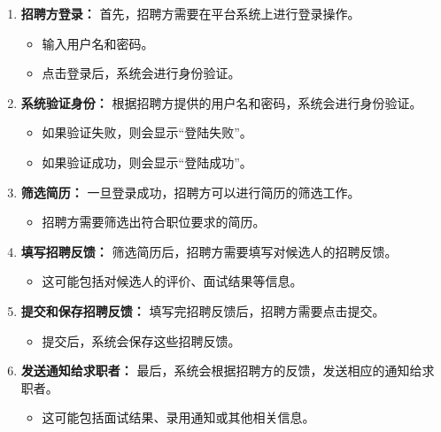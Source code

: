 \documentclass[UTF8,a4paper,10pt]{ctexart}
\begin{document}
\begin{enumerate}
    \item \textbf{招聘方登录：} 首先，招聘方需要在平台系统上进行登录操作。
        \begin{itemize}
            \item 输入用户名和密码。
            \item 点击登录后，系统会进行身份验证。
        \end{itemize}
    
    \item \textbf{系统验证身份：} 根据招聘方提供的用户名和密码，系统会进行身份验证。
        \begin{itemize}
            \item 如果验证失败，则会显示“登陆失败”。
            \item 如果验证成功，则会显示“登陆成功”。
        \end{itemize}
    
    \item \textbf{筛选简历：} 一旦登录成功，招聘方可以进行简历的筛选工作。
        \begin{itemize}
            \item 招聘方需要筛选出符合职位要求的简历。
        \end{itemize}
    
    \item \textbf{填写招聘反馈：} 筛选简历后，招聘方需要填写对候选人的招聘反馈。
        \begin{itemize}
            \item 这可能包括对候选人的评价、面试结果等信息。
        \end{itemize}
    
    \item \textbf{提交和保存招聘反馈：} 填写完招聘反馈后，招聘方需要点击提交。
        \begin{itemize}
            \item 提交后，系统会保存这些招聘反馈。
        \end{itemize}
    
    \item \textbf{发送通知给求职者：} 最后，系统会根据招聘方的反馈，发送相应的通知给求职者。
        \begin{itemize}
            \item 这可能包括面试结果、录用通知或其他相关信息。
        \end{itemize}
\end{enumerate}
\end{document}
